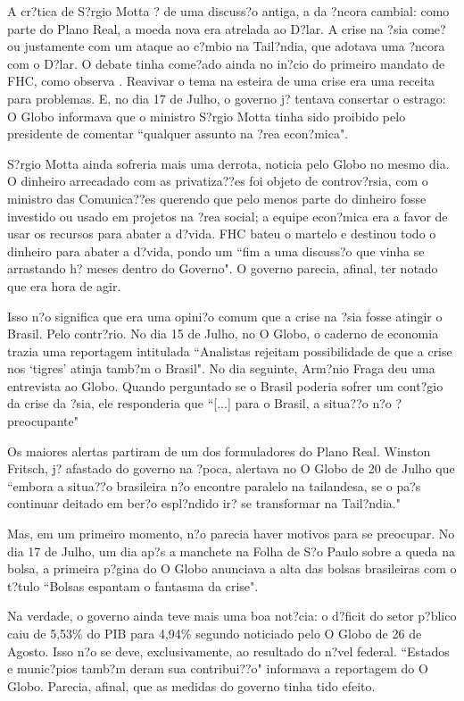\documentclass{article}
\begin{document}
A cr?tica de S?rgio Motta ? de uma discuss?o antiga, a da ?ncora cambial: como parte do Plano Real, a moeda nova era atrelada ao D?lar. A crise na ?sia come?ou justamente com um ataque ao c?mbio na Tail?ndia, que adotava uma ?ncora com o D?lar. O debate tinha come?ado ainda no in?cio do primeiro mandato de FHC, como observa \cite[p. 332]{Werneck2014}. Reavivar o tema na esteira de uma crise era uma receita para problemas. E, no dia 17 de Julho, o governo j? tentava consertar o estrago: O Globo informava que o ministro S?rgio Motta tinha sido proibido pelo presidente de comentar ``qualquer assunto na ?rea econ?mica".

S?rgio Motta ainda sofreria mais uma derrota, noticia pelo Globo no mesmo dia. O dinheiro arrecadado com as privatiza??es foi objeto de controv?rsia, com o ministro das Comunica??es querendo que pelo menos parte do dinheiro fosse investido ou usado em projetos na ?rea social; a equipe econ?mica era a favor de usar os recursos para abater a d?vida. FHC bateu o martelo e destinou todo o dinheiro para abater a d?vida, pondo um ``fim a uma discuss?o que vinha se arrastando h? meses dentro do Governo". O governo parecia, afinal, ter notado que era hora de agir.

Isso n?o significa que era uma opini?o comum que a crise na ?sia fosse atingir o Brasil. Pelo contr?rio. No dia 15 de Julho, no O Globo, o caderno de economia trazia uma reportagem intitulada ``Analistas rejeitam possibilidade de que a crise nos `tigres' atinja tamb?m o Brasil". No dia seguinte, Arm?nio Fraga deu uma entrevista ao Globo. Quando perguntado se o Brasil poderia sofrer um cont?gio da crise da ?sia, ele responderia que ``[...] para o Brasil, a situa??o n?o ? preocupante"  

Os maiores alertas partiram de um dos formuladores do Plano Real. Winston Fritsch, j? afastado do governo na ?poca, alertava no O Globo de 20 de Julho que ``embora a situa??o brasileira n?o encontre paralelo na tailandesa, se o pa?s continuar deitado em ber?o espl?ndido ir? se transformar na Tail?ndia." 

Mas, em um primeiro momento, n?o parecia haver motivos para se preocupar. No dia 17 de Julho, um dia ap?s a manchete na Folha de S?o Paulo sobre a queda na bolsa, a primeira p?gina do O Globo anunciava a alta das bolsas brasileiras com o t?tulo ``Bolsas espantam o fantasma da crise".    

Na verdade, o governo ainda teve mais uma boa not?cia: o d?ficit do setor p?blico caiu de 5,53\% do PIB para 4,94\% segundo noticiado pelo O Globo de 26 de Agosto. Isso n?o se deve, exclusivamente, ao resultado do n?vel federal. ``Estados e munic?pios tamb?m deram sua contribui??o" informava a reportagem do O Globo. Parecia, afinal, que as medidas do governo tinha tido efeito. 
\end{document}
